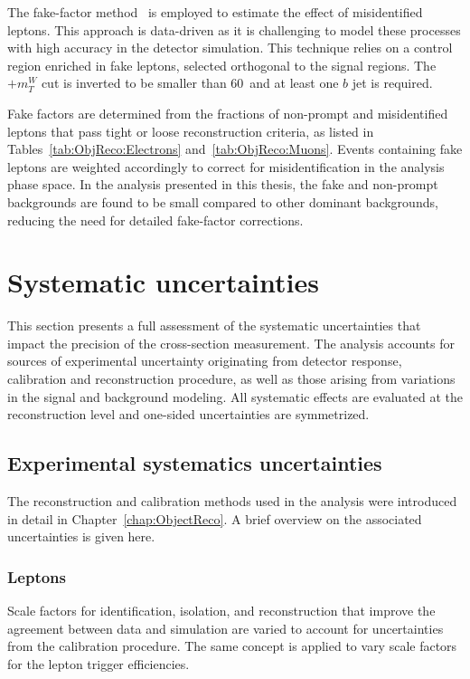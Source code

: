 The fake-factor method~\cite{EGAM-2019-01} is employed to estimate the effect of misidentified leptons.
This approach is data-driven as it is challenging to model these processes with high accuracy in the detector simulation.
This technique relies on a control region enriched in fake leptons, selected orthogonal to the signal regions.
The \ETmiss$+m_T^W$ cut is inverted to be smaller than 60~\GeV and at least one
$b$ jet is required.

Fake factors are determined from the fractions of non-prompt and misidentified leptons that pass tight or loose reconstruction criteria, as listed in Tables~\ref{tab:ObjReco:Electrons} and~\ref{tab:ObjReco:Muons}. Events containing fake leptons are weighted accordingly to correct for misidentification in the analysis phase space. In the analysis presented in this thesis, the fake and non-prompt backgrounds are found to be small compared to other dominant backgrounds, reducing the need for detailed fake-factor corrections.


\section{Systematic uncertainties}

This section presents a full assessment of the systematic uncertainties that impact the  precision of the cross-section measurement. The analysis accounts for sources of experimental uncertainty originating from detector response, calibration and reconstruction procedure, as well as those arising
from variations in the signal and background modeling. All systematic effects are evaluated at the reconstruction level and one-sided uncertainties are symmetrized.


\subsection{Experimental systematics uncertainties}

The reconstruction and calibration methods used in the analysis were introduced in detail in Chapter~\ref{chap:ObjectReco}. A brief overview on the associated uncertainties is given here.

\subsubsection{Leptons}

Scale factors for identification, isolation, and reconstruction that improve the agreement between data and simulation are varied to account for uncertainties from the calibration procedure. The same concept is applied to vary scale factors for the 
lepton trigger efficiencies.

